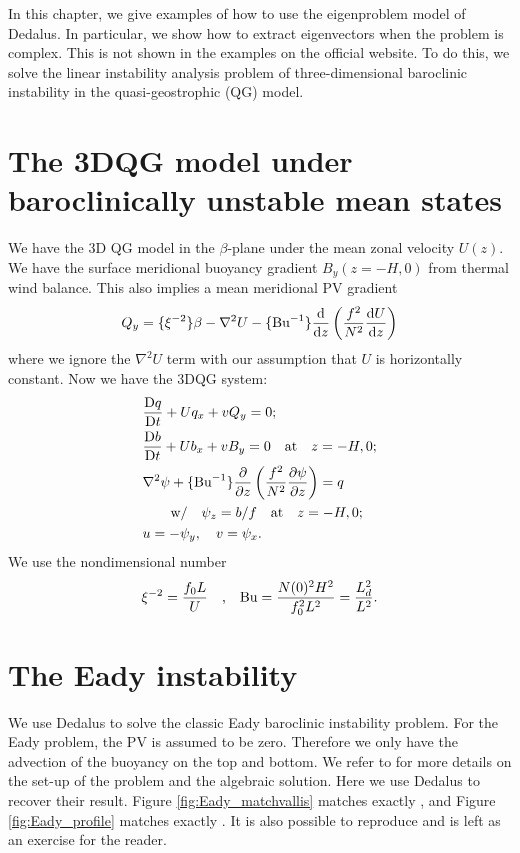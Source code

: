 \graphicspath{{3DQG_Linstab/code/figs/}}

In this chapter, we give examples of how to use the eigenproblem model of Dedalus. In particular, we show how to extract eigenvectors when the problem is complex. This is not shown in the examples on the official website. To do this, we solve the linear instability analysis problem of three-dimensional baroclinic instability in the quasi-geostrophic (QG) model.

\section{The 3DQG model under baroclinically unstable mean states}
We have the 3D QG model in the $\beta$-plane under the mean zonal velocity $U(z)$. We have the surface meridional buoyancy gradient $B_y(z=-H, 0)$ from thermal wind balance. This also implies a mean meridional PV gradient
\begin{align}
    Q_y = \{\xi^{-2}\}\beta-\nabla^2 U-\{\text{Bu}^{-1}\}\frac{\mathrm{d}}{\mathrm{d} z}\left(\frac{f^2}{N^2}\frac{\mathrm{d} U}{\mathrm{d} z}\right)
\end{align}
where we ignore the $\nabla^2 U$ term with our assumption that $U$ is horizontally constant. Now we have the 3DQG system:
\begin{align}
    &\frac{\mathrm{D} q}{\mathrm{D} t}+Uq_x+vQ_y = 0; \\
    &\frac{\mathrm{D} b}{\mathrm{D} t}+Ub_x+vB_y = 0 \quad \mbox{at} \quad z=-H, 0; \\
    &\nabla^2\psi + \{\text{Bu}^{-1}\}\frac{\partial}{\partial z}\left(\frac{f^2}{N^2}\frac{\partial\psi}{\partial z}\right) = q \\
    &\quad\quad \mbox{w/} \quad \psi_z = b/f \quad \mbox{at} \quad z=-H, 0; \\
    &u = -\psi_y, \quad v = \psi_x.
\end{align}
We use the nondimensional number
\begin{align}
    \xi^{-2} = \frac{f_0 L}{U} \quad \mbox{,} \quad \text{Bu} = \frac{N(0)^2H^2}{f_0^2L^2} = \frac{L_{d}^2}{L^2}.
\end{align}

\section{The Eady instability}
We use Dedalus to solve the classic Eady baroclinic instability problem. For the Eady problem, the PV is assumed to be zero. Therefore we only have the advection of the buoyancy on the top and bottom. We refer to \cite[\S 9.5]{Vallis_17} for more details on the set-up of the problem and the algebraic solution. Here we use Dedalus to recover their result. Figure \ref{fig:Eady_matchvallis} matches exactly \cite[Fig. 9.10]{Vallis_17}, and Figure \ref{fig:Eady_profile} matches exactly \cite[Fig. 9.12]{Vallis_17}. It is also possible to reproduce \cite[Fig. 9.11]{Vallis_17} and is left as an exercise for the reader.

